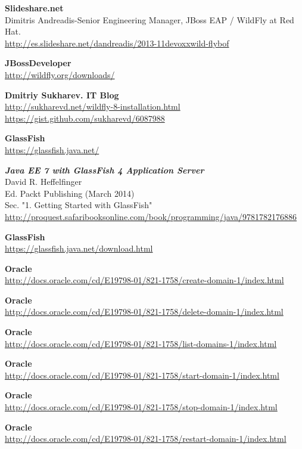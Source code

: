 \documentclass[a4paper, 10pt]{article}
\begin{document}
\begin{thebibliography}{10}
	\textbf{Slideshare.net}\\
	Dimitris Andreadis-Senior Engineering Manager, JBoss EAP / WildFly at Red Hat.\\
		\url{http://es.slideshare.net/dandreadis/2013-11devoxxwild-flybof}

	\textbf{JBossDeveloper}\\
		\url{http://wildfly.org/downloads/}
	
	\textbf{Dmitriy Sukharev. IT Blog}\\
		\url{http://sukharevd.net/wildfly-8-installation.html}
		\url{https://gist.github.com/sukharevd/6087988}
		
	
	\textbf{GlassFish}\\
		\url{https://glassfish.java.net/}

	\textbf{\textit{Java EE 7 with GlassFish 4 Application Server}}\\
	David R. Heffelfinger\\
	Ed. Packt Publishing (March 2014)\\
	Sec. "1. Getting Started with GlassFish"\\
		\url{http://proquest.safaribooksonline.com/book/programming/java/9781782176886}
		
	\textbf{GlassFish}\\
		\url{https://glassfish.java.net/download.html}
	
	\textbf{Oracle}\\
		\url{http://docs.oracle.com/cd/E19798-01/821-1758/create-domain-1/index.html}

	\textbf{Oracle}\\
		\url{http://docs.oracle.com/cd/E19798-01/821-1758/delete-domain-1/index.html}

	\textbf{Oracle}\\
		\url{http://docs.oracle.com/cd/E19798-01/821-1758/list-domains-1/index.html}

	\textbf{Oracle}\\
		\url{http://docs.oracle.com/cd/E19798-01/821-1758/start-domain-1/index.html}

	\textbf{Oracle}\\
		\url{http://docs.oracle.com/cd/E19798-01/821-1758/stop-domain-1/index.html}

	\textbf{Oracle}\\
		\url{http://docs.oracle.com/cd/E19798-01/821-1758/restart-domain-1/index.html}


\end{thebibliography}
\end{document}

